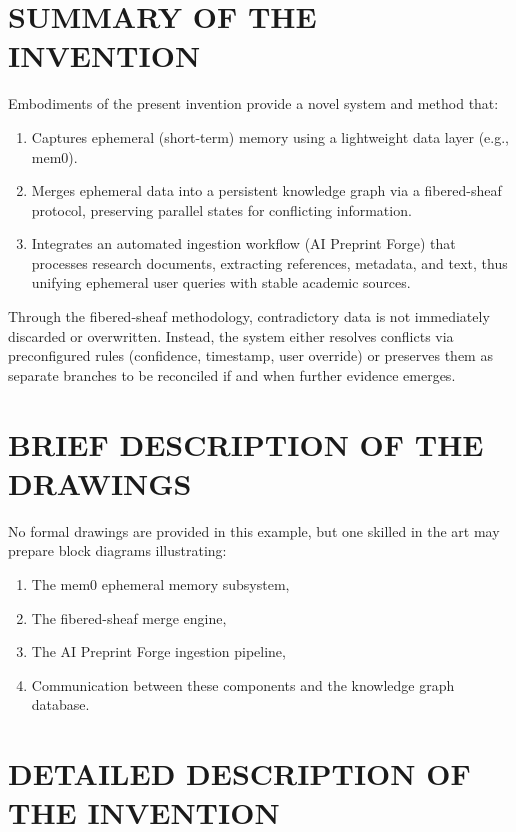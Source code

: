 \documentclass[12pt]{article}
\begin{document}
\section*{SUMMARY OF THE INVENTION}
Embodiments of the present invention provide a novel system and method that:
\begin{enumerate}
  \item Captures ephemeral (short-term) memory using a lightweight data layer (e.g., mem0).
  \item Merges ephemeral data into a persistent knowledge graph via a fibered-sheaf protocol,
        preserving parallel states for conflicting information.
  \item Integrates an automated ingestion workflow (AI Preprint Forge) that processes 
        research documents, extracting references, metadata, and text, thus unifying ephemeral 
        user queries with stable academic sources.
\end{enumerate}

Through the fibered-sheaf methodology, contradictory data is not immediately discarded or 
overwritten. Instead, the system either resolves conflicts via preconfigured rules (confidence, 
timestamp, user override) or preserves them as separate branches to be reconciled if and 
when further evidence emerges. 

\section*{BRIEF DESCRIPTION OF THE DRAWINGS}
No formal drawings are provided in this example, but one skilled in the art may
prepare block diagrams illustrating:
\begin{enumerate}
  \item The mem0 ephemeral memory subsystem,
  \item The fibered-sheaf merge engine,
  \item The AI Preprint Forge ingestion pipeline,
  \item Communication between these components and the knowledge graph database.
\end{enumerate}

\section*{DETAILED DESCRIPTION OF THE INVENTION}
\end{document}

